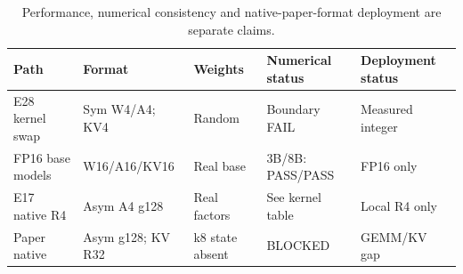 \begin{table}[t]
\centering
\small
\caption{Performance, numerical consistency and native-paper-format deployment are separate claims.}
\begin{tabular}{lllll}
\toprule
Path & Format & Weights & Numerical status & Deployment status \\
\midrule
E28 kernel swap & Sym W4/A4; KV4 & Random & Boundary FAIL & Measured integer \\
FP16 base models & W16/A16/KV16 & Real base & 3B/8B: PASS/PASS & FP16 only \\
E17 native R4 & Asym A4 g128 & Real factors & See kernel table & Local R4 only \\
Paper native & Asym g128; KV R32 & k8 state absent & BLOCKED & GEMM/KV gap \\
\bottomrule
\end{tabular}
\end{table}

